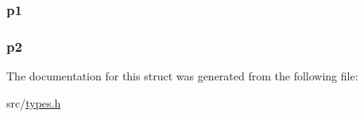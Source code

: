 \subsubsection[{\texorpdfstring{p1}{p1}}]{ p1}\hypertarget{struct_edge_aece77b6cba572ad1536ef0f6ce20cb82}{}\label{struct_edge_aece77b6cba572ad1536ef0f6ce20cb82}
\subsubsection[{\texorpdfstring{p2}{p2}}]{ p2}\hypertarget{struct_edge_a51a95439187066c7cc5f32a60cdef5a6}{}\label{struct_edge_a51a95439187066c7cc5f32a60cdef5a6}


The documentation for this struct was generated from the following file\+:\begin{DoxyCompactItemize}
\item 
src/\hyperlink{types_8h}{types.\+h}\end{DoxyCompactItemize}
